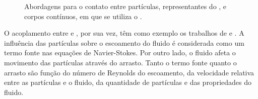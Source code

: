 \begin{figure}[h]
	\caption{Abordagens para o contato entre partículas, representantes do \DEM{}, e corpos contínuos, em que se utiliza o \FEM{}.}
	\centering
	\captionsetup[subfloat]{labelfont=bf}
	\label{fig:method_coupling:images}
\end{figure}

O acoplamento entre \DEM{} e \CFD{}, por sua vez, têm como exemplo os trabalhos de  e . A influência das partículas sobre o escoamento do fluido é considerada como um termo fonte nas equações de Navier-Stokes. Por outro lado, o fluido afeta o movimento das partículas através do arrasto. Tanto o termo fonte quanto o arrasto são função do número de Reynolds do escoamento, da velocidade relativa entre as partículas e o fluido, da quantidade de partículas e das propriedades do fluido.